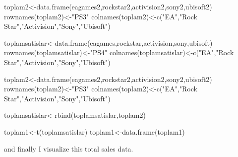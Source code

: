 \documentclass[
]{article}
\newenvironment{Shaded}{\begin{snugshade}}{\end{snugshade}}
\newcommand{\FunctionTok}[1]{\textcolor[rgb]{0.00,0.00,0.00}{#1}}
\newcommand{\NormalTok}[1]{#1}
\newcommand{\OtherTok}[1]{\textcolor[rgb]{0.56,0.35,0.01}{#1}}
\newcommand{\StringTok}[1]{\textcolor[rgb]{0.31,0.60,0.02}{#1}}
\begin{document}
\begin{Shaded}
\begin{Highlighting}[]
\NormalTok{toplam2}\OtherTok{\textless{}{-}}\FunctionTok{data.frame}\NormalTok{(eagames2,rockstar2,activision2,sony2,ubisoft2)}
\FunctionTok{rownames}\NormalTok{(toplam2)}\OtherTok{\textless{}{-}}\StringTok{"PS3"}
\FunctionTok{colnames}\NormalTok{(toplam2)}\OtherTok{\textless{}{-}}\FunctionTok{c}\NormalTok{(}\StringTok{"EA"}\NormalTok{,}\StringTok{"Rock Star"}\NormalTok{,}\StringTok{"Activision"}\NormalTok{,}\StringTok{"Sony"}\NormalTok{,}\StringTok{"Ubisoft"}\NormalTok{)}
\end{Highlighting}
\end{Shaded}

\begin{Shaded}
\begin{Highlighting}[]
\NormalTok{toplamsatislar}\OtherTok{\textless{}{-}}\FunctionTok{data.frame}\NormalTok{(eagames,rockstar,activision,sony,ubisoft)}
\FunctionTok{rownames}\NormalTok{(toplamsatislar)}\OtherTok{\textless{}{-}}\StringTok{"PS4"}
\FunctionTok{colnames}\NormalTok{(toplamsatislar)}\OtherTok{\textless{}{-}}\FunctionTok{c}\NormalTok{(}\StringTok{"EA"}\NormalTok{,}\StringTok{"Rock Star"}\NormalTok{,}\StringTok{"Activision"}\NormalTok{,}\StringTok{"Sony"}\NormalTok{,}\StringTok{"Ubisoft"}\NormalTok{)}

\NormalTok{toplam2}\OtherTok{\textless{}{-}}\FunctionTok{data.frame}\NormalTok{(eagames2,rockstar2,activision2,sony2,ubisoft2)}
\FunctionTok{rownames}\NormalTok{(toplam2)}\OtherTok{\textless{}{-}}\StringTok{"PS3"}
\FunctionTok{colnames}\NormalTok{(toplam2)}\OtherTok{\textless{}{-}}\FunctionTok{c}\NormalTok{(}\StringTok{"EA"}\NormalTok{,}\StringTok{"Rock Star"}\NormalTok{,}\StringTok{"Activision"}\NormalTok{,}\StringTok{"Sony"}\NormalTok{,}\StringTok{"Ubisoft"}\NormalTok{)}

\NormalTok{toplamsatislar}\OtherTok{\textless{}{-}}\FunctionTok{rbind}\NormalTok{(toplamsatislar,toplam2)}

\NormalTok{toplam1}\OtherTok{\textless{}{-}}\FunctionTok{t}\NormalTok{(toplamsatislar)}
\NormalTok{toplam1}\OtherTok{\textless{}{-}}\FunctionTok{data.frame}\NormalTok{(toplam1)}
\end{Highlighting}
\end{Shaded}

and finally I visualize this total sales data.
\end{document}
